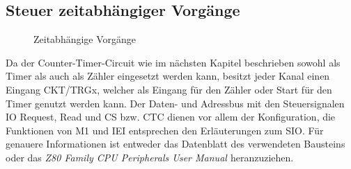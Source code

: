 \subsection{Steuer zeitabhängiger Vorgänge}
\begin{figure}[htb]
    \centering
    \qquad
    \qquad
    \caption[Z80 Zeitabhängige Vorgänge]{Zeitabhängige Vorgänge}
    \label{fig:z80-zeit}
\end{figure}
Da der Counter-Timer-Circuit wie im nächsten Kapitel beschrieben sowohl als Timer als auch als Zähler eingesetzt werden kann, besitzt jeder Kanal einen Eingang CKT/TRGx, welcher als Eingang für den Zähler oder Start für den Timer genutzt werden kann. Der Daten- und Adressbus mit den Steuersignalen IO Request, Read und CS bzw. CTC dienen vor allem der Konfiguration, die Funktionen von M1 und IEI entsprechen den Erläuterungen zum SIO. Für genauere Informationen ist entweder das Datenblatt des verwendeten Bausteins oder das \textit{Z80 Family CPU Peripherals User Manual \cite{z80:periph}} heranzuziehen.

